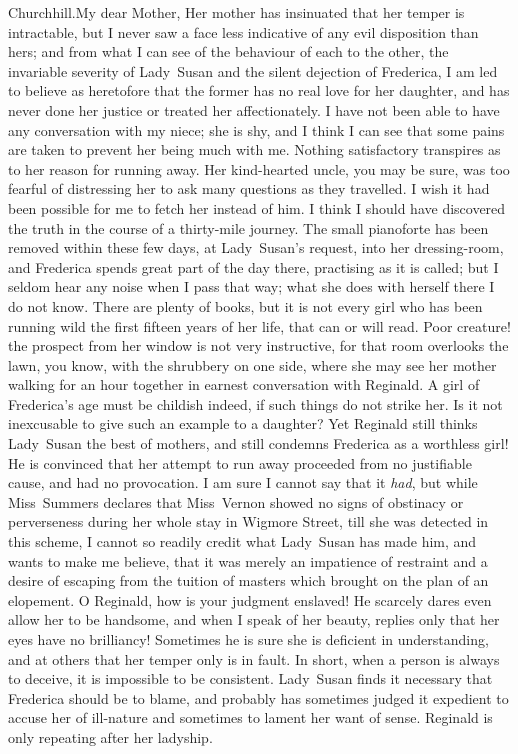 \begin{mail}{Churchhill.}{My dear Mother,}
Her mother has insinuated that her temper is intractable, but I never saw a face less indicative of any evil disposition than hers; and from what I can see of the behaviour of each to the other, the invariable severity of Lady~Susan and the silent dejection of Frederica, I am led to believe as heretofore that the former has no real love for her daughter, and has never done her justice or treated her affectionately. I have not been able to have any conversation with my niece; she is shy, and I think I can see that some pains are taken to prevent her being much with me. Nothing satisfactory transpires as to her reason for running away. Her kind-hearted uncle, you may be sure, was too fearful of distressing her to ask many questions as they travelled. I wish it had been possible for me to fetch her instead of him. I think I should have discovered the truth in the course of a thirty-mile journey. The small pianoforte has been removed within these few days, at Lady~Susan's request, into her dressing-room, and Frederica spends great part of the day there, practising as it is called; but I seldom hear any noise when I pass that way; what she does with herself there I do not know. There are plenty of books, but it is not every girl who has been running wild the first fifteen years of her life, that can or will read. Poor creature! the prospect from her window is not very instructive, for that room overlooks the lawn, you know, with the shrubbery on one side, where she may see her mother walking for an hour together in earnest conversation with Reginald. A girl of Frederica's age must be childish indeed, if such things do not strike her. Is it not inexcusable to give such an example to a daughter? Yet Reginald still thinks Lady~Susan the best of mothers, and still condemns Frederica as a worthless girl! He is convinced that her attempt to run away proceeded from no justifiable cause, and had no provocation. I am sure I cannot say that it \textit{had}, but while Miss~Summers declares that Miss~Vernon showed no signs of obstinacy or perverseness during her whole stay in Wigmore Street, till she was detected in this scheme, I cannot so readily credit what Lady~Susan has made him, and wants to make me believe, that it was merely an impatience of restraint and a desire of escaping from the tuition of masters which brought on the plan of an elopement. O Reginald, how is your judgment enslaved! He scarcely dares even allow her to be handsome, and when I speak of her beauty, replies only that her eyes have no brilliancy! Sometimes he is sure she is deficient in understanding, and at others that her temper only is in fault. In short, when a person is always to deceive, it is impossible to be consistent. Lady~Susan finds it necessary that Frederica should be to blame, and probably has sometimes judged it expedient to accuse her of ill-nature and sometimes to lament her want of sense. Reginald is only repeating after her ladyship. 

\end{mail}